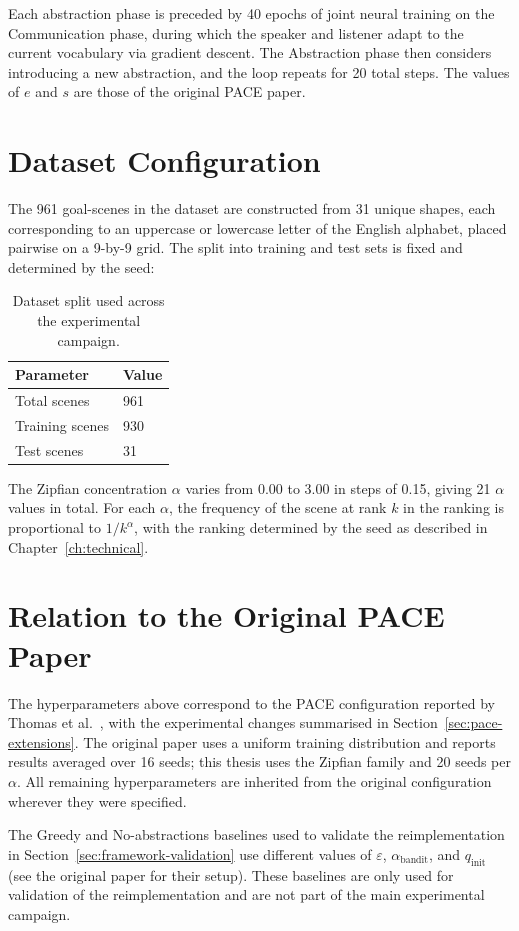 Each abstraction phase is preceded by 40 epochs of joint neural training on the Communication phase, during which the speaker and listener adapt to the current vocabulary via gradient descent. The Abstraction phase then considers introducing a new abstraction, and the loop repeats for 20 total steps. The values of $e$ and $s$ are those of the original PACE paper.

\section{Dataset Configuration}
\label{sec:appendix-dataset-configuration}

The 961 goal-scenes in the dataset are constructed from 31 unique shapes, each corresponding to an uppercase or lowercase letter of the English alphabet, placed pairwise on a 9-by-9 grid. The split into training and test sets is fixed and determined by the seed:

\begin{table}[htbp]
\centering
\begin{tabular}{ll}
\toprule
Parameter & Value \\
\midrule
Total scenes & 961 \\
Training scenes & 930 \\
Test scenes & 31 \\
\bottomrule
\end{tabular}
\caption{Dataset split used across the experimental campaign.}
\label{tab:dataset-configuration}
\end{table}

The Zipfian concentration $\alpha$ varies from 0.00 to 3.00 in steps of 0.15, giving 21 $\alpha$ values in total. For each $\alpha$, the frequency of the scene at rank $k$ in the ranking is proportional to $1/k^\alpha$, with the ranking determined by the seed as described in Chapter~\ref{ch:technical}.

\section{Relation to the Original PACE Paper}
\label{sec:appendix-original-pace-relation}

The hyperparameters above correspond to the PACE configuration reported by Thomas et al.~\cite{thomas_pace_2025}, with the experimental changes summarised in Section~\ref{sec:pace-extensions}. The original paper uses a uniform training distribution and reports results averaged over 16 seeds; this thesis uses the Zipfian family and 20 seeds per $\alpha$. All remaining hyperparameters are inherited from the original configuration wherever they were specified.

The Greedy and No-abstractions baselines used to validate the reimplementation in Section~\ref{sec:framework-validation} use different values of $\varepsilon$, $\alpha_{\text{bandit}}$, and $q_{\text{init}}$ (see the original paper for their setup). These baselines are only used for validation of the reimplementation and are not part of the main experimental campaign.